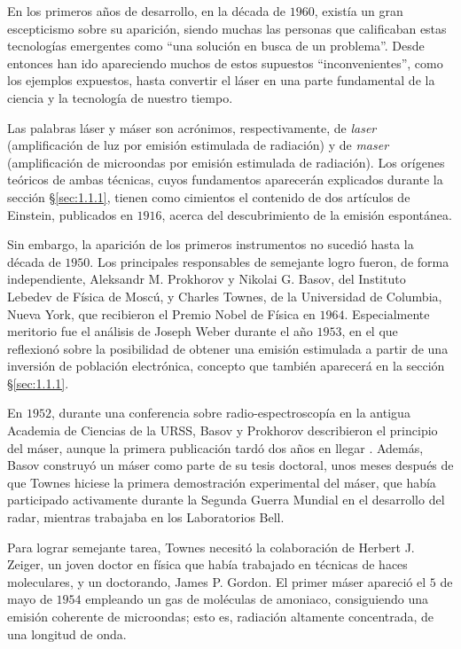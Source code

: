En los primeros años de desarrollo, en la década de $1960$, existía un gran escepticismo \autocite{SanchezRon2022} sobre su aparición, siendo muchas las personas que calificaban estas tecnologías emergentes como \enquote{una solución en busca de un problema}. Desde entonces han ido apareciendo muchos de estos supuestos \enquote{inconvenientes}, como los ejemplos expuestos, hasta convertir el láser en una parte fundamental de la ciencia y la tecnología de nuestro tiempo.  

Las palabras láser y máser son acrónimos, respectivamente, de \emph{\acrfull{laser}} (amplificación de luz por emisión estimulada de radiación) y de \emph{\acrfull{maser}} (amplificación de microondas por emisión estimulada de radiación). Los orígenes teóricos de ambas técnicas, cuyos fundamentos aparecerán explicados durante la sección \S\ref{sec:1.1.1}, tienen como cimientos el contenido de dos artículos de Einstein\autocite{Einstein1916,Einstein1916a}, publicados en $1916$, acerca del descubrimiento de la emisión espontánea.

Sin embargo, la aparición de los primeros instrumentos no sucedió hasta la década de $1950$. Los principales responsables de semejante logro fueron, de forma independiente, Aleksandr M. Prokhorov y Nikolai G. Basov, del Instituto Lebedev de Física de Moscú, y Charles Townes, de la Universidad de Columbia, Nueva York, que recibieron el Premio Nobel de Física en $1964$. Especialmente meritorio fue el análisis de Joseph Weber \autocite{Weber1953} durante el año $1953$, en el que reflexionó sobre la posibilidad de obtener una emisión estimulada a partir de una inversión de población electrónica, concepto que también aparecerá en la sección \S\ref{sec:1.1.1}.

En $1952$, durante una conferencia \autocite{SanchezRon2014} sobre radio-espectroscopía en la antigua Academia de Ciencias de la URSS, Basov y Prokhorov describieron el principio del máser, aunque la primera publicación tardó dos años en llegar \autocite{Basov1954}. Además, Basov construyó un máser como parte de su tesis doctoral, unos meses después de que Townes hiciese la primera demostración experimental del máser, que había participado activamente durante la Segunda Guerra Mundial en el desarrollo del radar, mientras trabajaba en los Laboratorios Bell.

Para lograr semejante tarea, Townes necesitó la colaboración de Herbert J. Zeiger, un joven doctor en física que había trabajado en técnicas de haces moleculares, y un doctorando, James P. Gordon. El primer máser apareció el $5$ de mayo de $1954$ empleando un gas de moléculas de amoniaco\autocite{Gordon1954}, consiguiendo una emisión coherente de microondas; esto es, radiación altamente concentrada, de una longitud de onda. 

